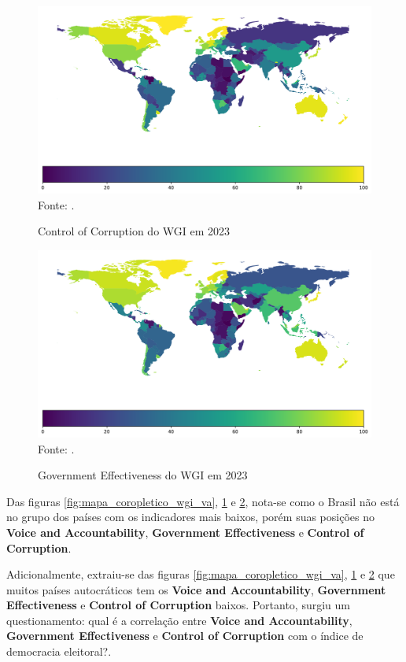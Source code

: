 \begin{figure}[H]
	\centering
	\caption{Control of Corruption do WGI em 2023}
	\includegraphics[width=1\linewidth]{figuras/mapa_coropletico_wgi_cc}
	\label{fig:mapa_coropletico_wgi_cc}
	\footnotesize{Fonte: \cite{wgi_dados}.}
\end{figure}

\begin{figure}[H]
	\centering
	\caption{Government Effectiveness do WGI em 2023}
	\includegraphics[width=1\linewidth]{figuras/mapa_coropletico_wgi_ge}
	\label{fig:mapa_coropletico_wgi_ge}
	\footnotesize{Fonte: \cite{wgi_dados}.}
\end{figure}

Das figuras \ref{fig:mapa_coropletico_wgi_va}, \ref{fig:mapa_coropletico_wgi_cc} e \ref{fig:mapa_coropletico_wgi_ge}, nota-se como o Brasil não está no grupo dos países com os indicadores mais baixos, porém suas posições no \textbf{Voice and Accountability}, \textbf{Government Effectiveness} e \textbf{Control of Corruption}.

Adicionalmente, extraiu-se das figuras \ref{fig:mapa_coropletico_wgi_va}, \ref{fig:mapa_coropletico_wgi_cc} e \ref{fig:mapa_coropletico_wgi_ge} que muitos países autocráticos tem os \textbf{Voice and Accountability}, \textbf{Government Effectiveness} e \textbf{Control of Corruption} baixos. Portanto, surgiu um questionamento: qual é a correlação entre \textbf{Voice and Accountability}, \textbf{Government Effectiveness} e \textbf{Control of Corruption} com o índice de democracia eleitoral?. 

